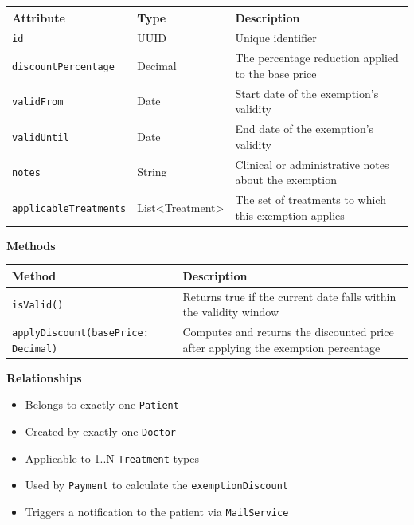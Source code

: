 \documentclass[12pt, a4paper]{article}
\begin{document}
\begin{center}
\small
\renewcommand{\arraystretch}{1.35}
\begin{tabularx}{\textwidth}{|>{\raggedright\arraybackslash}p{3.4cm}|>{\raggedright\arraybackslash}p{3.3cm}|Y|}
\hline
{}
\textbf{Attribute} & \textbf{Type} & \textbf{Description} \\ \hline
\texttt{id} & UUID & Unique identifier \\ \hline
\texttt{discountPercentage} & Decimal & The percentage reduction applied to the base price \\ \hline
\texttt{validFrom} & Date & Start date of the exemption's validity \\ \hline
\texttt{validUntil} & Date & End date of the exemption's validity \\ \hline
\texttt{notes} & String & Clinical or administrative notes about the exemption \\ \hline
\texttt{applicableTreatments} & List\textless{}Treatment\textgreater{} & The set of treatments to which this exemption applies \\ \hline
\end{tabularx}
\end{center}

\textbf{Methods}

\begin{center}
\small
\renewcommand{\arraystretch}{1.35}
\begin{tabularx}{\textwidth}{|M|Y|}
\hline
{}
\textbf{Method} & \textbf{Description} \\ \hline
\texttt{isValid()} & Returns true if the current date falls within the validity window \\ \hline
\texttt{applyDiscount(basePrice: Decimal)} & Computes and returns the discounted price after applying the exemption percentage \\ \hline
\end{tabularx}
\end{center}

\textbf{Relationships}

\begin{itemize}
    \item Belongs to exactly one \texttt{Patient}
    \item Created by exactly one \texttt{Doctor}
    \item Applicable to 1..N \texttt{Treatment} types
    \item Used by \texttt{Payment} to calculate the \texttt{exemptionDiscount}
    \item Triggers a notification to the patient via \texttt{MailService}
\end{itemize}
\end{document}
